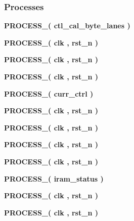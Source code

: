 \subsubsection*{Processes}
 \begin{DoxyCompactItemize}
\item 
{\bf P\+R\+O\+C\+E\+S\+S\+\_}{\bfseries  ( {\bfseries {\bfseries {\bf ctl\+\_\+cal\+\_\+byte\+\_\+lanes}} \textcolor{vhdlchar}{ }} )}
\item 
{\bf P\+R\+O\+C\+E\+S\+S\+\_}{\bfseries  ( {\bfseries {\bfseries {\bf clk}} \textcolor{vhdlchar}{ }} , {\bfseries {\bfseries {\bf rst\+\_\+n}} \textcolor{vhdlchar}{ }} )}
\item 
{\bf P\+R\+O\+C\+E\+S\+S\+\_}{\bfseries  ( {\bfseries {\bfseries {\bf clk}} \textcolor{vhdlchar}{ }} , {\bfseries {\bfseries {\bf rst\+\_\+n}} \textcolor{vhdlchar}{ }} )}
\item 
{\bf P\+R\+O\+C\+E\+S\+S\+\_}{\bfseries  ( {\bfseries {\bfseries {\bf clk}} \textcolor{vhdlchar}{ }} , {\bfseries {\bfseries {\bf rst\+\_\+n}} \textcolor{vhdlchar}{ }} )}
\item 
{\bf P\+R\+O\+C\+E\+S\+S\+\_}{\bfseries  ( {\bfseries {\bfseries {\bf curr\+\_\+ctrl}} \textcolor{vhdlchar}{ }} )}
\item 
{\bf P\+R\+O\+C\+E\+S\+S\+\_}{\bfseries  ( {\bfseries {\bfseries {\bf clk}} \textcolor{vhdlchar}{ }} , {\bfseries {\bfseries {\bf rst\+\_\+n}} \textcolor{vhdlchar}{ }} )}
\item 
{\bf P\+R\+O\+C\+E\+S\+S\+\_}{\bfseries  ( {\bfseries {\bfseries {\bf clk}} \textcolor{vhdlchar}{ }} , {\bfseries {\bfseries {\bf rst\+\_\+n}} \textcolor{vhdlchar}{ }} )}
\item 
{\bf P\+R\+O\+C\+E\+S\+S\+\_}{\bfseries  ( {\bfseries {\bfseries {\bf clk}} \textcolor{vhdlchar}{ }} , {\bfseries {\bfseries {\bf rst\+\_\+n}} \textcolor{vhdlchar}{ }} )}
\item 
{\bf P\+R\+O\+C\+E\+S\+S\+\_}{\bfseries  ( {\bfseries {\bfseries {\bf clk}} \textcolor{vhdlchar}{ }} , {\bfseries {\bfseries {\bf rst\+\_\+n}} \textcolor{vhdlchar}{ }} )}
\item 
{\bf P\+R\+O\+C\+E\+S\+S\+\_}{\bfseries  ( {\bfseries {\bfseries {\bf iram\+\_\+status}} \textcolor{vhdlchar}{ }} )}
\item 
{\bf P\+R\+O\+C\+E\+S\+S\+\_}{\bfseries  ( {\bfseries {\bfseries {\bf clk}} \textcolor{vhdlchar}{ }} , {\bfseries {\bfseries {\bf rst\+\_\+n}} \textcolor{vhdlchar}{ }} )}
\item 
{\bf P\+R\+O\+C\+E\+S\+S\+\_}{\bfseries  ( {\bfseries {\bfseries {\bf clk}} \textcolor{vhdlchar}{ }} , {\bfseries {\bfseries {\bf rst\+\_\+n}} \textcolor{vhdlchar}{ }} )}

\end{DoxyCompactItemize}
